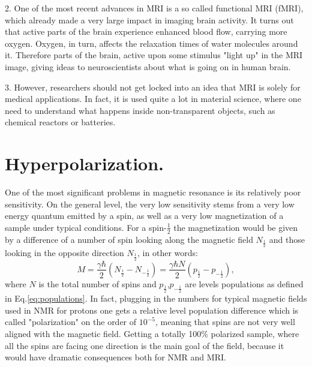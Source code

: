 \documentclass[a4paper, 12pt]{article}
\begin{document}
  2. One of the most recent advances in MRI is a so called functional MRI (fMRI), which already made a very large impact in imaging brain activity. It turns out that active parts of the brain experience enhanced blood flow, carrying more oxygen. Oxygen, in turn, affects the relaxation times of water molecules around it. Therefore parts of the brain, active upon some stimulus "light up" in the MRI image, giving ideas to neuroscientists about what is going on in human brain.

  3. However, researchers should not get locked into an idea that MRI is solely for medical applications. In fact, it is used quite a lot in material science, where one need to understand what happens inside non-transparent objects, such as chemical reactors or batteries.
  
\section{Hyperpolarization.}

  One of the most significant problems in magnetic resonance is its relatively poor sensitivity. On the general level, the very low sensitivity stems from  a very low energy quantum emitted by a spin, as well as a very low magnetization of a sample under typical conditions. For a spin-$\frac{1}{2}$ the magnetization would be given by a difference of a number of spin looking along the magnetic field $N_{\frac{1}{2}}$ and those looking in the opposite direction $N_{\frac{1}{2}}$, in other words:
  \begin{equation}
  M = \dfrac{\gamma \hbar}{2} ( N_{\frac{1}{2}} - N_{-\frac{1}{2}}) = \dfrac{\gamma \hbar N}{2}  (p_{\frac{1}{2}} - p_{-\frac{1}{2}}),  
  \end{equation}
  where $N$ is the total number of spins and $p_{\frac{1}{2}}$,$p_{-\frac{1}{2}}$ are levels populations as defined in Eq.\ref{eq:populations}. In fact, plugging in the numbers for typical magnetic fields used in NMR for protons one gets a relative level population difference which is called "polarization" on the order of $10^{-5}$, meaning that spins are not very well aligned with the magnetic field. Getting a totally 100\% polarized sample, where all the spins are facing one direction is the main goal of the field, because it would have dramatic consequences both for NMR and MRI.
  
\end{document}
